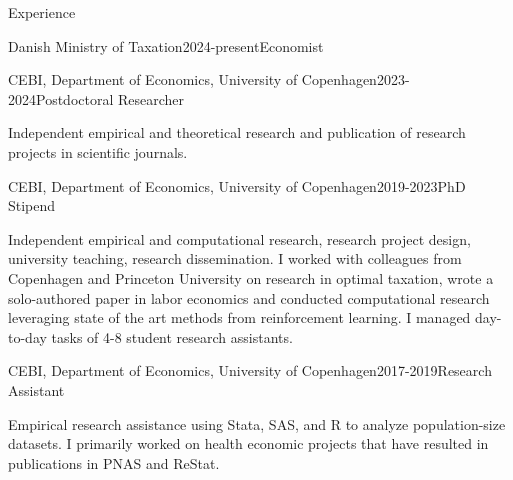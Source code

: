 \documentclass[
	10pt, %
]{resume} %
\begin{document}
\begin{rSection}{Experience}
    \begin{rSubsection}{Danish Ministry of Taxation}{2024-present}{Economist}{}
        \item[] 
    \end{rSubsection}

    \begin{rSubsection}{CEBI, Department of Economics, University of Copenhagen}{2023-2024}{Postdoctoral Researcher}{}
        \item[] Independent empirical and theoretical research and publication of research projects in scientific journals.
    \end{rSubsection}

    \begin{rSubsection}{CEBI, Department of Economics, University of Copenhagen}{2019-2023}{PhD Stipend}{}
        \item[] Independent empirical and computational research, research project design, university teaching, research dissemination. I worked with colleagues from Copenhagen and Princeton University on research in optimal taxation, wrote a solo-authored paper in labor economics and conducted computational research leveraging state of the art methods from reinforcement learning. I managed day-to-day tasks of 4-8 student research assistants.
    \end{rSubsection}

    \begin{rSubsection}{CEBI, Department of Economics, University of Copenhagen}{2017-2019}{Research Assistant}{}
        \item[] Empirical research assistance using Stata, SAS, and R to analyze population-size datasets. I primarily worked on health economic projects that have resulted in publications in PNAS and ReStat.
    \end{rSubsection}


\end{rSection}
\end{document}
